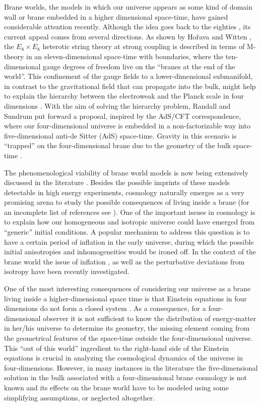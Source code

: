 \documentclass[prd,a4paper,twocolumn,superscriptaddress,nofootinbib,showpacs]{revtex4}
\begin{document}
Brane worlds, the models in which our universe appears as some kind of domain wall or brane
embedded in a higher dimensional space-time, have gained considerable attention recently.
Although the idea goes back to the eighties \cite{rubshap}, its current appeal comes from 
several directions. As shown by Ho\v{r}ava and Witten \cite{hw}, 
the $E_{8} \times E_{8}$ heterotic string theory at strong coupling is described in terms 
of M-theory in an eleven-dimensional space-time with boundaries, where the ten-dimensional 
gauge degrees of freedom live on the ``branes at the end of the world''. This confinement
of the gauge fields to a lower-dimensional submanifold, in contrast to the gravitational field
that can propagate into the bulk, might help to explain the hierarchy between the 
electroweak and the Planck scale in four dimensions \cite{lardim}. With the aim of
solving the hierarchy problem, Randall and Sundrum \cite{rs}
put forward a proposal, inspired by
the AdS/CFT correspondence, where our four-dimensional universe is embedded in a non-factorizable
way into five-dimensional anti-de Sitter (AdS) space-time. Gravity in this scenario is ``trapped'' 
on the four-dimensional brane due to the geometry of the bulk space-time \cite{rs,gt}.

The phenomenological viability of brane world models  is now being extensively discussed in the 
literature \cite{phen}. Besides the possible imprints of these models detectable in high energy 
experiments, cosmology naturally emerges as a very promising arena to study  the possible consequences
of living inside a brane (for an incomplete list of references see \cite{bc,mwbh,cll}). 
One of the important issues in  cosmology is 
to explain how our homogeneous and isotropic universe could have
emerged from ``generic'' initial conditions. A popular mechanism to address this question is
to have a certain period of inflation in the early universe, during
which the possible initial anisotropies and inhomogeneities would be ironed off.
In the context of the brane world the issue of inflation 
\cite{mwbh,cll,hl}, as well as the perturbative
deviations from isotropy \cite{mss,svf} have been recently investigated. 

One of the most interesting consequences of 
considering our universe as a brane living inside a higher-dimensional space time is that
Einstein equations in four dimensions do not form a closed system \cite{mss}. As a
consequence, for a four-dimensional observer it is not sufficient to know the distribution of 
energy-matter in her/his universe to determine its geometry,  the missing element
coming from the geometrical features of the space-time outside the four-dimensional
universe. This ``out of this world'' ingredient to the right-hand side of the Einstein equations
is crucial in analyzing the cosmological dynamics of the universe in four-dimensions. However, 
in many instances in the literature the five-dimensional solution in the bulk associated with a
four-dimensional brane cosmology is not known and its effects on the brane world have 
to be modeled 
using some simplifying  assumptions, or neglected altogether.  
\end{document}
